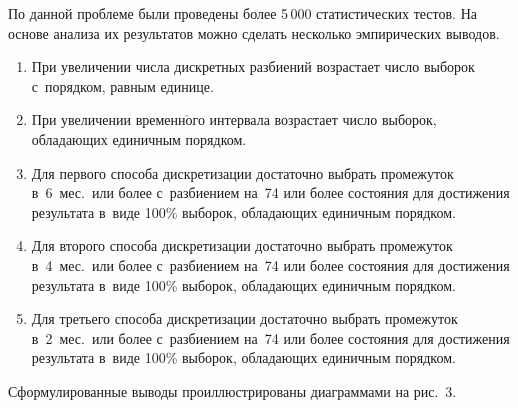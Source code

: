 \begin{multicols}{2}
  По данной проблеме были проведены более 5\,000 статистических тестов. На 
основе анализа их результатов можно сделать несколько эмпирических 
выводов.
  \begin{enumerate}[1.]
\item При увеличении числа дискретных разбиений возрастает число 
выборок с~порядком, равным единице.
\item При увеличении временн$\acute{\mbox{о}}$го интервала воз\-рас\-та\-ет 
число выборок, обладающих единичным порядком.
\item Для первого способа дискретизации достаточно выбрать 
промежуток в~6~мес.\ или более с~раз\-би\-ени\-ем на~74 или более 
состояния для достижения результата в~виде 100\% выборок, обла\-да\-ющих 
единичным порядком.
\item Для второго способа дискретизации достаточно выбрать 
промежуток в~4~мес.\ или более с~раз\-би\-ени\-ем на~74 или более 
состояния для достижения результата в~виде 100\% выборок, обла\-да\-ющих 
единичным порядком.
\item Для третьего способа дискретизации достаточно выбрать 
промежуток в~2~мес.\ или более с~раз\-би\-ени\-ем на~74 или более 
состояния для достижения результата в~виде 100\% выборок, обла\-да\-ющих 
единичным порядком.
\end{enumerate}
  
  Сформулированные выводы проиллюстрированы диаграммами на рис.~3.
  
 \pagebreak

\end{multicols}

\begin{figure*} %
\vspace*{1pt}
\begin{minipage}[t]{80mm}
  \begin{center}  
    \mbox{%
\epsfxsize=70.086mm
}

\end{center}
\vspace*{-11pt}
\end{minipage}
\hfill
\vspace*{1pt}
\begin{minipage}[t]{80mm}
  \begin{center}  
    \mbox{%
\epsfxsize=70.086mm
}

\end{center}
\vspace*{-11pt}
\end{minipage}
\end{figure*}


